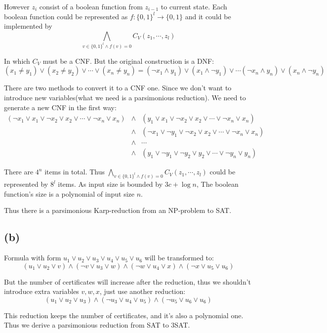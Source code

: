 \documentclass[paper=a4, fontsize=11pt]{scrartcl} %
\numberwithin{equation}{section} %
\numberwithin{figure}{section} %
\numberwithin{table}{section} %
\begin{document}
However $z_i$ consist of a boolean function from $z_{i-1}$ to current state. Each boolean function could be represented as $f: \{0, 1\}^l \rightarrow \{0, 1\}$ and it could be implemented by
$$ \bigwedge_{v\in \{0, 1\}^l \wedge f(v)=0} C_V(z_1, \cdots, z_l)$$

In which $C_V$ must be a CNF. But the original construction is a DNF:
$$(x_1 \not= y_1) \vee (x_2 \not= y_2) \vee \cdots \vee (x_n \not= y_n) = (\neg x_1 \wedge y_1) \vee (x_1 \wedge \neg y_1) \vee \cdots (\neg x_n \wedge y_n) \vee (x_n \wedge \neg y_n) $$

There are two methods to convert it to a CNF one. Since we don't want to introduce new variables(what we need is a parsimonious reduction). We need to generate a new CNF in the first way:
$$
\begin{array}{lll}(\neg x_1 \vee x_1 \vee \neg x_2 \vee x_2 \vee \cdots \vee \neg x_n \vee x_n) & \wedge & (y_1 \vee x_1 \vee \neg x_2 \vee x_2 \vee \cdots \vee \neg x_n \vee x_n) \\ & \wedge & (\neg x_1 \vee \neg y_1 \vee \neg x_2 \vee x_2 \vee \cdots \vee \neg x_n \vee x_n) \\ & \wedge & \cdots \\ & \wedge & (y_1 \vee \neg y_1 \vee \neg y_2 \vee y_2 \vee \cdots \vee \neg y_n \vee y_n)\end{array}$$

There are $4^n$ items in total. Thus $\bigwedge\limits_{v\in \{0, 1\}^l \wedge f(v)=0} C_V(z_1, \cdots, z_l)$ could be represented by $8^l$ items. As input size is bounded by $3c + \log n$, The boolean function's size is a polynomial of input size $n$.

Thus there is a parsimonious Karp-reduction from an NP-problem to SAT.
\subsection*{(b)}
Formula with form $u_1 \vee u_2 \vee u_3 \vee u_4 \vee u_5 \vee u_6$ will be transformed to:
$$(u_1 \vee u_2 \vee v) \wedge (\neg v \vee u_3 \vee w) \wedge (\neg w \vee u_4 \vee x) \wedge (\neg x \vee u_5 \vee u_6) $$

But the number of certificates will increase after the reduction, thus we shouldn't introduce extra variables $v, w, x$, just use another reduction:
$$(u_1 \vee u_2 \vee u_3) \wedge (\neg u_3 \vee u_4 \vee u_5) \wedge (\neg u_5 \vee u_6 \vee u_6) $$

This reduction keeps the number of certificates, and it's also a polynomial one. Thus we derive a parsimonious reduction from SAT to 3SAT.
\end{document}
